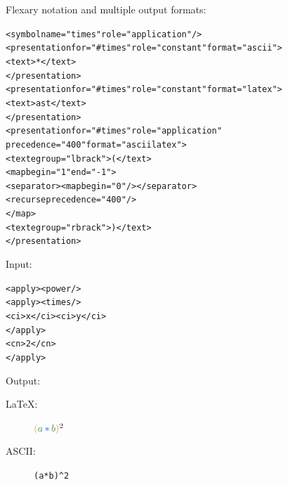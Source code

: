 \documentclass[a0,portrait]{a0poster}
\newcommand{\bsl}{\symbol{'134}}
\begin{document}
\begin{multicols}{2}
Flexary notation and multiple output formats:
\begin{minipage}[t]{.6\linewidth} {\small
\begin{alltt}
<symbol \textcolor{DarkRed!75}{name="times"} \textcolor{violet!75}{role="application"}/>
<presentation \textcolor{DarkRed!75}{for="#times"} \textcolor{DeepPink!75}{role="constant"} \textcolor[HTML]{3232B1}{format="ascii"}>
  <text>*</text>
</presentation>
<presentation \textcolor{DarkRed!75}{for="#times"} \textcolor{DeepPink!75}{role="constant"} \textcolor[HTML]{3232B1}{format="latex"}>
  <text>\bsl{}ast</text>
</presentation>
<presentation \textcolor{DarkRed!75}{for="#times"} \textcolor{violet!75}{role="application"}
 precedence="400" \textcolor[HTML]{3232B1}{format="ascii latex"}>
  \textcolor{DarkGoldenrod!75}{<text egroup="lbrack">(</text>}
  \textcolor{DarkGreen!75}{<map begin="1" end="-1">}
    <separator>\textcolor{DeepPink!75}{<map begin="0"/>}</separator>
    \textcolor{DarkGreen!75}{<recurse precedence="400"/>}
  \textcolor{DarkGreen!75}{</map>}
  \textcolor{DarkGoldenrod!75}{<text egroup="rbrack">)</text>}
</presentation>
\end{alltt}}
\end{minipage}\hspace{.02\linewidth}%
\begin{minipage}[t]{.35\linewidth}
  {\normalsize Input:}
  {\normalsize
\begin{alltt}
<apply><power/>
  \textcolor{violet!75}{<apply>}\textcolor{DarkRed!75}{<times/>}
    \textcolor{DarkGreen!75}{<ci>x</ci><ci>y</ci>}
  \textcolor{violet!75}{</apply>}
  <cn>2</cn>
</apply>
\end{alltt}}
      {\normalsize Output:
      \begin{description}
      \item[{\textcolor[HTML]{3232B1}{\LaTeX:}}] $\textcolor{DarkGoldenrod!75}{(}\textcolor{DarkGreen!75}{a}\mathop{\textcolor{blue!75}{\ast}}\textcolor{DarkGreen!75}{b}\textcolor{DarkGoldenrod!75}{)}^2$
      \item[{\textcolor[HTML]{3232B1}{ASCII:}}] \begin{alltt}\textcolor{DarkGoldenrod!75}{(}\textcolor{DarkGreen!75}{a}\textcolor{blue!75}{*}\textcolor{DarkGreen!75}{b}\textcolor{DarkGoldenrod!75}{)}^2\end{alltt}
      \end{description}}
    \end{minipage}\\[1ex]


\end{multicols}
\end{document}
